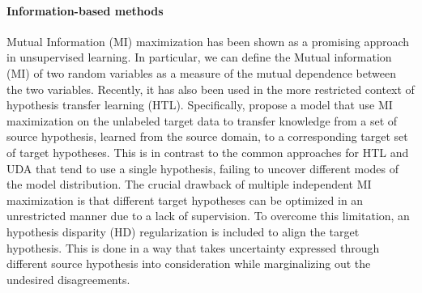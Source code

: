 \paragraph{Information-based methods}
Mutual Information (MI) maximization has been shown as a promising approach in unsupervised learning. In particular, we can define the Mutual information (MI) of two random variables as a measure of the mutual dependence between the two variables. Recently, it has also been used in the more restricted context of hypothesis transfer learning (HTL). Specifically, \cite[Lao et al.]{Lao2020} propose a model that use MI maximization on the unlabeled target data to transfer knowledge from a set of source hypothesis, learned from the source domain, to a corresponding target set of target hypotheses. This is in contrast to the common approaches for HTL and UDA that tend to use a single hypothesis, failing to uncover different modes of the model distribution.
The crucial drawback of multiple independent MI maximization is that different target hypotheses can be optimized in an unrestricted manner due to a lack of supervision. To overcome this limitation, an hypothesis disparity (HD) regularization is included to align the target hypothesis. This is done in a way that takes uncertainty expressed through different source hypothesis into consideration while marginalizing out the undesired disagreements.